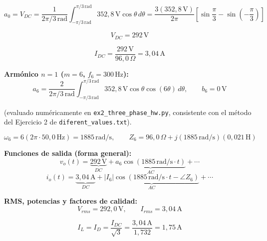 \documentclass[12pt,a4paper]{article}
\begin{document}
\begin{equation}
    a_0 = V_{DC} = \frac{1}{2\pi/3\,\text{rad}}\int_{-\pi/3\,\text{rad}}^{\pi/3\,\text{rad}} 352{,}8\,\text{V}\cos\theta\,d\theta
    = \frac{3(352{,}8\,\text{V})}{2\pi}\left[\sin\frac{\pi}{3}-\sin\left(-\frac{\pi}{3}\right)\right]
\end{equation}

\begin{equation}
    \boxed{V_{DC} = 292\,\text{V}}
\end{equation}

\begin{equation}
    I_{DC} = \frac{292\,\text{V}}{96{,}0\,\Omega} = \boxed{3{,}04\,\text{A}}
\end{equation}

\textbf{Armónico $n=1$ ($m=6$, $f_6=300\,\text{Hz}$):}
\begin{equation}
    a_6 = \frac{2}{2\pi/3\,\text{rad}}\int_{-\pi/3\,\text{rad}}^{\pi/3\,\text{rad}} 352{,}8\,\text{V}\cos\theta\cos(6\theta)\,d\theta,
    \qquad b_6 = 0\,\text{V}
\end{equation}

(evaluado numéricamente en \texttt{ex2\_three\_phase\_hw.py}, consistente con el
método del Ejercicio 2 de \texttt{diferent\_values.txt}).

\begin{equation}
    \omega_6 = 6(2\pi\cdot50{,}0\,\text{Hz}) = 1885\,\text{rad/s}, \qquad
    Z_6 = 96{,}0\,\Omega + j(1885\,\text{rad/s})(0{,}021\,\text{H})
\end{equation}

\textbf{Funciones de salida (forma general):}
\begin{equation}
    v_o(t) = \underbrace{292\,\text{V}}_{DC} + \underbrace{a_6\cos(1885\,\text{rad/s}\cdot t)}_{AC} + \cdots
\end{equation}
\begin{equation}
    i_o(t) = \underbrace{3{,}04\,\text{A}}_{DC} + \underbrace{|I_6|\cos(1885\,\text{rad/s}\cdot t - \angle Z_6)}_{AC} + \cdots
\end{equation}

\textbf{RMS, potencias y factores de calidad:}
\begin{equation}
    V_{rms} = \boxed{292{,}0\,\text{V}}, \qquad I_{rms} = \boxed{3{,}04\,\text{A}}
\end{equation}

\begin{equation}
    I_L = I_D = \frac{I_{DC}}{\sqrt3} = \frac{3{,}04\,\text{A}}{1{,}732} = \boxed{1{,}75\,\text{A}}
\end{equation}
\end{document}

